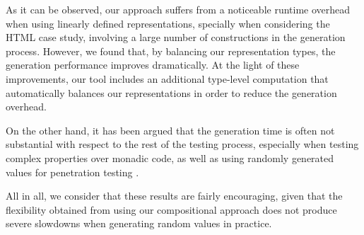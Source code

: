 As it can be observed, our approach suffers from a noticeable runtime overhead
when using linearly defined representations, specially when considering the HTML
case study, involving a large number of constructions in the generation process.
%
However, we found that, by balancing our representation types, the generation
performance improves dramatically.
%
At the light of these improvements, our tool includes an additional type-level
computation that automatically balances our representations in order to reduce
the generation overhead.


On the other hand, it has been argued that the generation time is often not
substantial with respect to the rest of the testing process, especially when
testing complex properties over monadic code, as well as using randomly
generated values for penetration testing
\cite{DBLP:conf/haskell/MistaRH18,grieco2017}.


All in all, we consider that these results are fairly encouraging, given that
the flexibility obtained from using our compositional approach does not produce
severe slowdowns when generating random values in practice.

